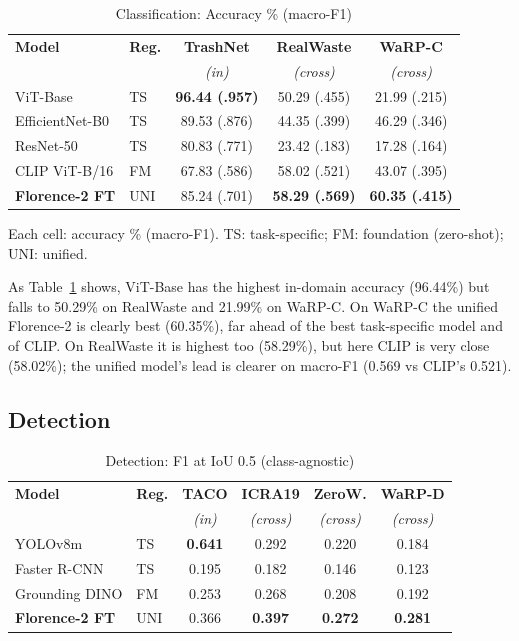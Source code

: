 \documentclass[conference]{IEEEtran}
\begin{document}
\begin{table}[htbp]
\caption{Classification: Accuracy \% (macro-F1)}
\label{tab:cls}
\begin{center}
\setlength{\tabcolsep}{3.5pt}
\footnotesize
\begin{tabular}{@{}llccc@{}}
\toprule
\textbf{Model} & \textbf{Reg.} & \textbf{TrashNet} & \textbf{RealWaste} & \textbf{WaRP-C} \\
 & & \textit{(in)} & \textit{(cross)} & \textit{(cross)} \\
\midrule
ViT-Base & TS & \textbf{96.44 (.957)} & 50.29 (.455) & 21.99 (.215) \\
EfficientNet-B0 & TS & 89.53 (.876) & 44.35 (.399) & 46.29 (.346) \\
ResNet-50 & TS & 80.83 (.771) & 23.42 (.183) & 17.28 (.164) \\
CLIP ViT-B/16 & FM & 67.83 (.586) & 58.02 (.521) & 43.07 (.395) \\
\textbf{Florence-2 FT} & UNI & 85.24 (.701) & \textbf{58.29 (.569)} & \textbf{60.35 (.415)} \\
\bottomrule
\end{tabular}
\end{center}
\footnotesize Each cell: accuracy \% (macro-F1). TS: task-specific; FM: foundation (zero-shot); UNI: unified.
\end{table}

As Table~\ref{tab:cls} shows, ViT-Base has the highest in-domain accuracy (96.44\%)
but falls to 50.29\% on RealWaste and 21.99\% on WaRP-C. On WaRP-C the unified Florence-2 is clearly best
(60.35\%), far ahead of the best task-specific model and of CLIP. On RealWaste it is highest
too (58.29\%), but here CLIP is very close (58.02\%); the unified model's lead is
clearer on macro-F1 (0.569 vs CLIP's 0.521).

\subsection{Detection}

\begin{table}[htbp]
\caption{Detection: F1 at IoU 0.5 (class-agnostic)}
\label{tab:det}
\begin{center}
\begin{tabular}{@{}llcccc@{}}
\toprule
\textbf{Model} & \textbf{Reg.} & \textbf{TACO} & \textbf{ICRA19} & \textbf{ZeroW.} & \textbf{WaRP-D} \\
 & & \textit{(in)} & \textit{(cross)} & \textit{(cross)} & \textit{(cross)} \\
\midrule
YOLOv8m & TS & \textbf{0.641} & 0.292 & 0.220 & 0.184 \\
Faster R-CNN & TS & 0.195 & 0.182 & 0.146 & 0.123 \\
Grounding DINO & FM & 0.253 & 0.268 & 0.208 & 0.192 \\
\textbf{Florence-2 FT} & UNI & 0.366 & \textbf{0.397} & \textbf{0.272} & \textbf{0.281} \\
\bottomrule
\end{tabular}
\end{center}
\end{table}
\end{document}
